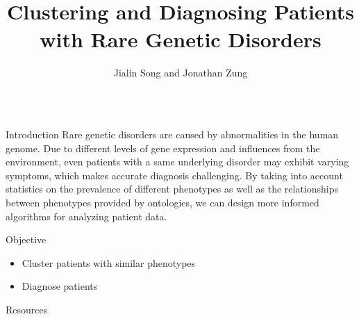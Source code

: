 \documentclass[final]{beamer} %
\title[]{{\fontsize{220}{240}\selectfont \vspace{5cm} \\
    Clustering and Diagnosing Patients with Rare Genetic Disorders
    \vspace{5cm} }} \author[]{\huge Jialin Song and Jonathan Zung}
\institute[University of Toronto]{\huge Computational Biology Lab,
  University of Toronto} \date{}
\begin{document}
\begin{frame}{}
  \maketitle
  \vspace{-3cm}
  \begin{columns}[T]
    \begin{column}{0.3\linewidth}

    \begin{block}{\Huge Introduction}
      \Large Rare genetic disorders are caused by abnormalities in the
      human genome. Due to different levels of gene expression and
      influences from the environment, even patients with a same
      underlying disorder may exhibit varying symptoms, which makes
      accurate diagnosis challenging. By taking into account
      statistics on the prevalence of different phenotypes as well as
      the relationships between phenotypes provided by ontologies, we
      can design more informed algorithms for analyzing patient data.

    \end{block}
    \begin{block}{\Huge Objective}
      \begin{itemize}
        \Large
      \item Cluster patients with similar phenotypes
      \item Diagnose patients
      \end{itemize}
    \end{block}

   
    \begin{block}{\Huge Resources}
 

\end{block}
\end{column}
\end{columns}
\end{frame}
\end{document}
